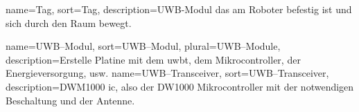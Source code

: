 {
	name={Tag}, sort={Tag},
	description={UWB-Modul das am Roboter befestig ist und sich durch den Raum bewegt.}
}

{
	name={UWB--Modul}, sort={UWB--Modul}, plural={UWB--Module},
	description={Erstelle Platine mit dem \gls{uwbt}, dem Mikrocontroller, der Energieversorgung, usw.}
}
{
	name={UWB--Transceiver}, sort={UWB--Transceiver},
	description={DWM1000 \gls{ic}, also der DW1000 Mikrocontroller mit der notwendigen Beschaltung und der Antenne.}
}






